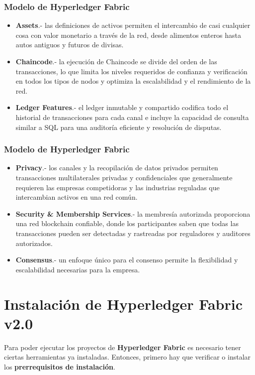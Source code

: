 \documentclass{beamer}
\begin{document}
	\begin{frame}
		\frametitle{Modelo de Hyperledger Fabric}
		\begin{itemize}
			\item \textbf{Assets}.- las definiciones de activos permiten el intercambio de casi cualquier cosa con valor monetario a través de la red, desde alimentos enteros hasta autos antiguos y futuros de divisas.
			\item \textbf{Chaincode}.- la ejecución de Chaincode se divide del orden de las transacciones, lo que limita los niveles requeridos de confianza y verificación en todos los tipos de nodos y optimiza la escalabilidad y el rendimiento de la red.
			\item \textbf{Ledger Features}.- el ledger inmutable y compartido codifica todo el historial de transacciones para cada canal e incluye la capacidad de consulta similar a SQL para una auditoría eficiente y resolución de disputas.
		\end{itemize}
	\end{frame}

	\begin{frame}
		\frametitle{Modelo de Hyperledger Fabric}
		\begin{itemize}
			\item \textbf{Privacy}.- los canales y la recopilación de datos privados permiten transacciones multilaterales privadas y confidenciales que generalmente requieren las empresas competidoras y las industrias reguladas que intercambian activos en una red común.
			\item \textbf{Security \& Membership Services}.- la membresía autorizada proporciona una red blockchain confiable, donde los participantes saben que todas las transacciones pueden ser detectadas y rastreadas por reguladores y auditores autorizados.
			\item \textbf{Consensus}.- un enfoque único para el consenso permite la flexibilidad y escalabilidad necesarias para la empresa.
		\end{itemize}
	\end{frame}
	
	\section{Instalación de Hyperledger Fabric v2.0}
	
	\begin{frame}
		Para poder ejecutar los proyectos de \textbf{Hyperledger Fabric} es necesario tener ciertas herramientas ya instaladas. Entonces, primero hay que verificar o instalar los \textbf{prerrequisitos de instalación}.
	\end{frame}
	
\end{document}
